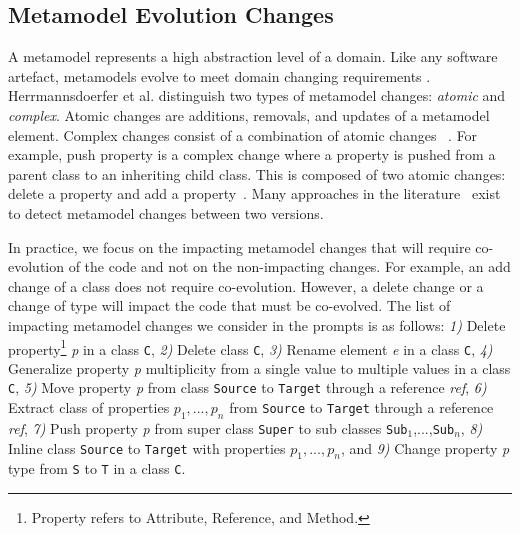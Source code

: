 \subsection{Metamodel Evolution Changes}
 \label{mmchanges}
A metamodel represents a high abstraction level of a domain.
Like any software artefact, metamodels evolve to meet domain changing requirements \cite{mens2008introduction}.
Herrmannsdoerfer et al. \cite{Herrmannsdoerfer2011} distinguish two types of metamodel changes: \emph{atomic} and \emph{complex}. Atomic changes are additions, removals, and updates of a metamodel element. Complex changes consist of a combination of atomic changes ~\cite{vermolen2011reconstructing,khelladi2015detecting}. 
%
For example, push property is a complex change where a property is pushed from a parent class to an inheriting child class. This is composed of two atomic changes: delete a property and add a property~\cite{Herrmannsdoerfer2011}. 
Many approaches in the literature~\cite{Alter2015, williams2012searching,cicchetti2009managing,langer2013posteriori,vermolen2011reconstructing,Khelladi2016,bettini2022executable} exist to detect metamodel changes between two versions. 

In practice, we focus on the impacting metamodel changes that will require co-evolution of the code and not on the non-impacting changes. For example, an add change of a class does not require co-evolution. However, a delete change or a change of type will impact the code that must be co-evolved. 
The list of impacting metamodel changes \cite{iovino2012impact,cicchetti2009managing} we consider in the prompts is as follows: \emph{1)} Delete property\footnote{Property refers to Attribute, Reference, and Method.} \emph{p} in a class \texttt{C}, \emph{2)} Delete class \texttt{C}, \emph{3)} Rename element \emph{e} in a class \texttt{C}, \emph{4)} Generalize property \emph{p} multiplicity from a single value to multiple values in a class \texttt{C},  \emph{5)} Move property \emph{p} from class \texttt{Source} to \texttt{Target} through a reference \emph{ref},  \emph{6)} Extract class of properties $p_{1},...,p_{n}$ from \texttt{Source} to \texttt{Target} through a reference \emph{ref},  \emph{7)} Push property \emph{p} from super class \texttt{Super} to sub classes \texttt{Sub$_{1}$},...,\texttt{Sub$_{n}$}, \emph{8)} Inline class \texttt{Source} to \texttt{Target} with properties $p_{1},...,p_{n}$, and \emph{9)} Change property \emph{p} type from \texttt{S} to \texttt{T} in a class \texttt{C}. 

